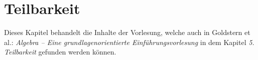 \chapter{Teilbarkeit}

Dieses Kapitel behandelt die Inhalte der Vorlesung, welche auch in Goldstern et al.: \textit{Algebra -- Eine grundlagenorientierte Einführungsvorlesung} in dem Kapitel \textit{5. Teilbarkeit} gefunden werden können.



